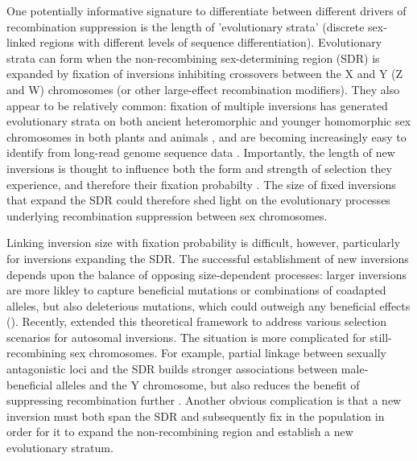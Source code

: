 \documentclass{article}
\begin{document}
One potentially informative signature to differentiate between different drivers of recombination suppression is the length of 'evolutionary strata' (discrete sex-linked regions with different levels of sequence differentiation). Evolutionary strata can form when the non-recombining sex-determining region (SDR) is expanded by fixation of inversions inhibiting crossovers between the X and Y (Z and W) chromosomes (or other large-effect recombination modifiers). They also appear to be relatively common: fixation of multiple inversions has generated evolutionary strata on both ancient heteromorphic and younger homomorphic sex chromosomes in both plants and animals \citep{LahnPage1999,Handley2004, Wang2012}, and are becoming increasingly easy to identify from long-read genome sequence data \citep{WellenreutherBernatchez2018}. Importantly, the length of new inversions is thought to influence both the form and strength of selection they experience, and therefore their fixation probabilty \citep{vanValenLevins1968, KrimbasPowell1992}. The size of fixed inversions that expand the SDR could therefore shed light on the evolutionary processes underlying recombination suppression between sex chromosomes. 

Linking inversion size with fixation probability is difficult, however, particularly for inversions expanding the SDR. The successful establishment of new inversions depends upon the balance of opposing size-dependent processes: larger inversions are more likley to capture beneficial mutations or combinations of coadapted alleles, but also deleterious mutations, which could outweigh any beneficial effects (\citealt{Nei1967,vanValenLevins1968, Santos1986, ChengKirkpatrick2019}). Recently, \citet{ConnallonOlito2020} extended this theoretical framework to address various selection scenarios for autosomal inversions. The situation is more complicated for still-recombining sex chromosomes. For example, partial linkage between sexually antagonistic loci and the SDR builds stronger associations between male-beneficial alleles and the Y chromosome, but also reduces the benefit of suppressing recombination further \citep{Nei1969,Otto2019}. Another obvious complication is that a new inversion must both span the SDR and subsequently fix in the population in order for it to expand the non-recombining region and establish a new evolutionary stratum. 
\end{document}
